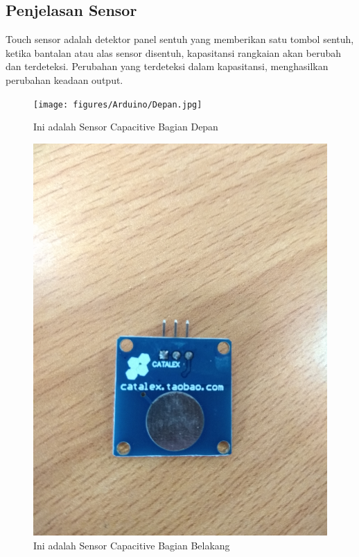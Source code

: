 \subsection{Penjelasan Sensor}
Touch sensor adalah detektor panel sentuh yang memberikan satu tombol sentuh, ketika bantalan atau alas sensor disentuh, kapasitansi rangkaian akan berubah dan terdeteksi. Perubahan yang terdeteksi dalam kapasitansi, menghasilkan perubahan keadaan output.
\begin{figure}[!htbp]
  \centering
  \texttt{[image: figures/Arduino/Depan.jpg]}
  \caption{Ini adalah Sensor Capacitive Bagian Depan}\label{fig:sentuh}
\end{figure}
\begin{figure}[!htbp]
  \centering
  \includegraphics[width=.75\textwidth]{figures/Arduino/Belakang.jpg}
  \caption{Ini adalah Sensor Capacitive Bagian Belakang}\label{fig:sentuh1}
\end{figure}